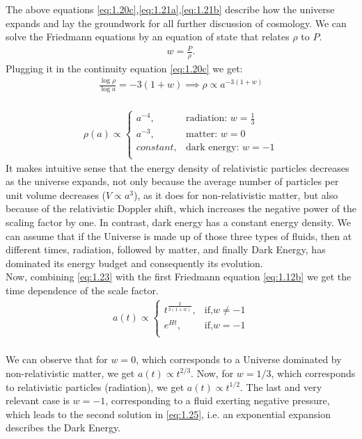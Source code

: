 \hspace{0.5cm}The above equations \ref{eq:1.20c},\ref{eq:1.21a},\ref{eq:1.21b} describe how the universe expands and lay the groundwork for all further discussion of cosmology.
We can solve the Friedmann equations by an equation of state that relates $\rho$ to $P$. 
\begin{align}
    w = \frac{P}{\rho} . 
\end{align}
Plugging it in the continuity equation \ref{eq:1.20c} we get:
\begin{align}
    \frac{ \log \rho}{ \log a} = {-3(1 + w)} \implies \rho \propto a^{-3(1 + w)}\label{eq:1.23} 
\end{align}\\

\begin{align}
    \rho(a) \propto 
    \begin{cases}
        a^{-4} ,& \text{radiation: }  w =\frac{1}{3}\\
        a^{-3},              & \text{matter: }  w = 0\\
        constant,              & \text{dark energy: }  w = -1\\
    \end{cases}\label{eq:1.24}
\end{align}
It makes intuitive sense that the energy density of relativistic particles decreases as the universe expands, not only because the average number of particles per unit volume decreases ($V \propto a^3$), as it does for non-relativistic matter, but also because of the relativistic Doppler shift, which increases the negative power of the scaling factor by one. 
In contrast, dark energy has a constant energy density. 
We can assume that if the Universe is made up of those three types of fluids, then at different times, radiation, followed by matter, and finally Dark Energy, has dominated its energy budget and consequently its evolution.\\
Now, combining \ref{eq:1.23} with the first Friedmann equation \ref{eq:1.12b} we get the time dependence of the scale factor.
\begin{align}
    a(t) \propto 
    \begin{cases}
        t^{\frac{2}{3(1+w)}} ,& \text{if,}  w\neq -1\\
        e^{Ht},               & \text{if,}  w = -1\\
    \end{cases}\label{eq:1.25}
\end{align}\\
We can observe that for $w = 0$, which corresponds to a Universe dominated by non-relativistic matter, we get $a(t) \propto  t^{2/3}$. 
Now, for $w = 1/3$, which corresponds to relativistic particles (radiation), we get $a(t) \propto  t^{1/2}$. 
The last and very relevant case is $w = -1$, corresponding to a fluid exerting negative pressure, which leads to the second solution in \ref{eq:1.25}, i.e. an exponential expansion describes the Dark Energy.



